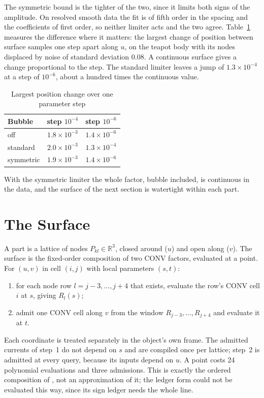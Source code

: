 \documentclass[journal]{IEEEtran}
\newcommand{\R}{\mathbb{R}}
\begin{document}
The symmetric bound is the tighter of the two, since it limits both signs
of the amplitude. On resolved smooth data the fit is of fifth order in the
spacing and the coefficients of first order, so neither limiter acts and
the two agree. Table~\ref{tab:jump} measures the difference where it
matters: the largest change of position between surface samples one step
apart along $u$, on the teapot body with its nodes displaced by noise of
standard deviation 0.08. A continuous surface gives a change proportional
to the step. The standard limiter leaves a jump of $1.3\times10^{-4}$ at a
step of $10^{-6}$, about a hundred times the continuous value.

\begin{table}[H]
\caption{Largest position change over one parameter step}
\label{tab:jump}
\centering
\scriptsize
\begin{tabular}{l|cc}
\hline
Bubble & step $10^{-4}$ & step $10^{-6}$\\
\hline
off        & $1.8\times10^{-3}$ & $1.4\times10^{-6}$\\
standard   & $2.0\times10^{-3}$ & $1.3\times10^{-4}$\\
symmetric  & $1.9\times10^{-3}$ & $1.4\times10^{-6}$\\
\hline
\end{tabular}
\end{table}

With the symmetric limiter the whole factor, bubble included, is
continuous in the data, and the surface of the next section is watertight
within each part.

\section{The Surface}
\label{sec:surface}

A part is a lattice of nodes $P_{kl}\in\R^3$, closed around ($u$) and open
along ($v$). The surface is the fixed-order composition of two CONV
factors, evaluated at a point. For $(u,v)$ in cell $(i,j)$ with local
parameters $(s,t)$:
\begin{enumerate}
\item for each node row $l=j-3,\ldots,j+4$ that exists, evaluate the
row's CONV cell $i$ at $s$, giving $R_l(s)$;
\item admit one CONV cell along $v$ from the window $R_{j-3},\ldots,R_{j+4}$
and evaluate it at $t$.
\end{enumerate}
Each coordinate is treated separately in the object's own frame. The
admitted currents of step~1 do not depend on $s$ and are compiled once
per lattice; step~2 is admitted at every query, because its inputs depend
on $u$. A point costs 24 polynomial evaluations and three admissions.
This is exactly the ordered composition of \cite{convpaper}, not an
approximation of it; the ledger form could not be evaluated this way,
since its sign ledger needs the whole line.
\end{document}
